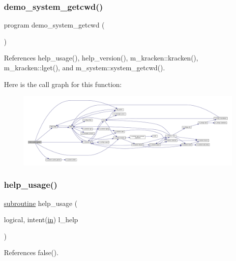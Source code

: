 \subsubsection{\texorpdfstring{demo\+\_\+system\+\_\+getcwd()}{demo\_system\_getcwd()}}
{\footnotesize\ttfamily program demo\+\_\+system\+\_\+getcwd (\begin{DoxyParamCaption}{ }\end{DoxyParamCaption})}



References help\+\_\+usage(), help\+\_\+version(), m\+\_\+kracken\+::kracken(), m\+\_\+kracken\+::lget(), and m\+\_\+system\+::system\+\_\+getcwd().

Here is the call graph for this function\+:
\nopagebreak
\begin{figure}[H]
\begin{center}
\leavevmode
\includegraphics[width=350pt]{__pwd_8f90_a64555eabda1ed68b752904f9cbc26868_cgraph}
\end{center}
\end{figure}
\mbox{\label{__pwd_8f90_a3e09a3b52ee8fb04eeb93fe5761626a8}} 
\subsubsection{\texorpdfstring{help\+\_\+usage()}{help\_usage()}}
{\footnotesize\ttfamily \hyperlink{M__stopwatch_83_8txt_acfbcff50169d691ff02d4a123ed70482}{subroutine} help\+\_\+usage (\begin{DoxyParamCaption}\item[{logical, intent(\hyperlink{M__journal_83_8txt_afce72651d1eed785a2132bee863b2f38}{in})}]{l\+\_\+help }\end{DoxyParamCaption})}



References false().

